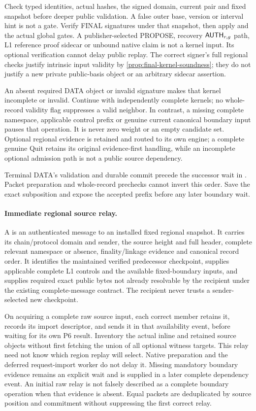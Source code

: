Check typed identities, actual hashes, the signed domain, current pair
and fixed snapshot before deeper public validation. A false outer base,
version or interval hint is not a gate. Verify FINAL signatures under
that snapshot, then apply  and the actual global gates.
A publisher-selected PROPOSE, recovery $\mathsf{AUTH}_{r,g}$ path, L1
reference proof sidecar or unbound native claim is not a kernel input.
Its optional verification cannot delay public replay. The correct
signer's full regional checks justify intrinsic input validity by
\cref{prop:final-kernel-soundness}; they do not justify a new private
public-basis object or an arbitrary sidecar assertion.

An absent required DATA object or invalid signature makes that kernel
incomplete or invalid. Continue with independently complete kernels;
no whole-record validity flag suppresses a valid neighbor. In contrast,
a missing complete namespace, applicable control prefix or genuine
current canonical boundary input pauses that operation. It is never
zero weight or an empty candidate set. Optional regional evidence is
retained and routed to its own engine; a complete genuine Quit retains
its original evidence-first handling, while an incomplete optional
admission path is not a public source dependency.

Terminal DATA's validation and durable commit precede the successor
wait in . Packet preparation and whole-record
prechecks cannot invert this order. Save the exact subposition and
expose the accepted prefix before any later boundary wait.

\paragraph{Immediate regional source relay.}
A  is an authenticated message to an installed fixed
regional snapshot. It carries its chain/protocol domain and sender,
the source height and full header, complete relevant namespace or
absence, finality/linkage evidence and canonical record order. It
identifies the maintained verified predecessor checkpoint, supplies
applicable complete L1 controls and the available fixed-boundary
inputs, and supplies required exact public bytes not already resolvable
by the recipient under the existing complete-message contract. The
recipient never trusts a sender-selected new checkpoint.

On acquiring a complete raw source input, each correct member retains it, records its import
descriptor, and sends it in that availability event, before waiting for its own P6
result. Inventory the actual inline and retained source objects without
first fetching the union of all optional witness targets. This relay
need not know which region replay will select. Native preparation and the deferred request-import worker do
not delay it. Missing mandatory boundary evidence remains an explicit
wait and is supplied in a later complete dependency event. An initial
raw relay is not falsely described as a complete boundary operation
when that evidence is absent. Equal packets are deduplicated by source
position and commitment without suppressing the first correct relay.

